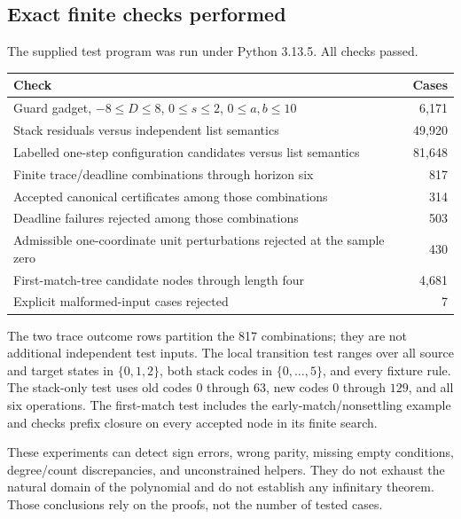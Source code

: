 \documentclass[11pt,letterpaper]{article}
\theoremstyle{definition}
\theoremstyle{remark}
\newcommand{\1}{\mathbf 1}
\begin{document}
\subsection{Exact finite checks performed}
The supplied test program was run under Python 3.13.5. All checks passed.
\begin{center}\small
\begin{tabularx}{\textwidth}{@{}Xr@{}}
\toprule
Check & Cases\\
\midrule
Guard gadget, $-8\leq D\leq8$, $0\leq s\leq2$, $0\leq a,b\leq10$ & 6,171\\
Stack residuals versus independent list semantics & 49,920\\
Labelled one-step configuration candidates versus list semantics & 81,648\\
Finite trace/deadline combinations through horizon six & 817\\
Accepted canonical certificates among those combinations & 314\\
Deadline failures rejected among those combinations & 503\\
Admissible one-coordinate unit perturbations rejected at the sample zero & 430\\
First-match-tree candidate nodes through length four & 4,681\\
Explicit malformed-input cases rejected & 7\\
\bottomrule
\end{tabularx}
\end{center}
The two trace outcome rows partition the 817 combinations; they are not
additional independent test inputs. The local transition test ranges over
all source and target states in $\{0,1,2\}$, both stack codes in
$\{0,\ldots,5\}$, and every fixture rule. The stack-only test uses old
codes $0$ through $63$, new codes $0$ through $129$, and all six operations.
The first-match test includes the early-match/nonsettling example and
checks prefix closure on every accepted node in its finite search.

These experiments can detect sign errors, wrong parity, missing empty
conditions, degree/count discrepancies, and unconstrained helpers. They
do not exhaust the natural domain of the polynomial and do not establish
any infinitary theorem. Those conclusions rely on the proofs, not the
number of tested cases.
\end{document}
